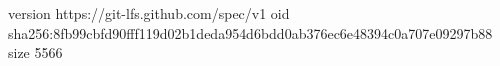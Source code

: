 version https://git-lfs.github.com/spec/v1
oid sha256:8fb99cbfd90fff119d02b1deda954d6bdd0ab376ec6e48394c0a707e09297b88
size 5566
